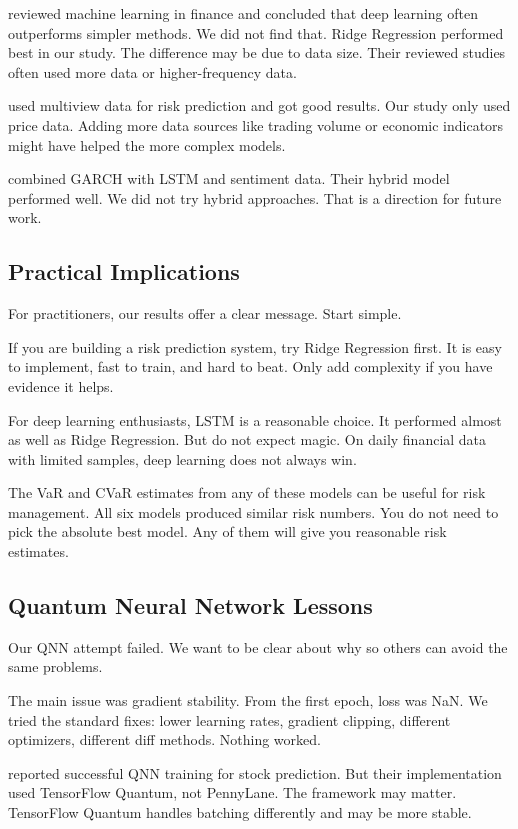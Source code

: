\documentclass[12pt,a4paper]{article}
\begin{document}
\citet{elalami2025b} reviewed machine learning in finance and concluded that deep learning often outperforms simpler methods. We did not find that. Ridge Regression performed best in our study. The difference may be due to data size. Their reviewed studies often used more data or higher-frequency data.

\citet{wang2026} used multiview data for risk prediction and got good results. Our study only used price data. Adding more data sources like trading volume or economic indicators might have helped the more complex models.

\citet{leber2025} combined GARCH with LSTM and sentiment data. Their hybrid model performed well. We did not try hybrid approaches. That is a direction for future work.

\subsection{Practical Implications}
For practitioners, our results offer a clear message. Start simple.

If you are building a risk prediction system, try Ridge Regression first. It is easy to implement, fast to train, and hard to beat. Only add complexity if you have evidence it helps.

For deep learning enthusiasts, LSTM is a reasonable choice. It performed almost as well as Ridge Regression. But do not expect magic. On daily financial data with limited samples, deep learning does not always win.

The VaR and CVaR estimates from any of these models can be useful for risk management. All six models produced similar risk numbers. You do not need to pick the absolute best model. Any of them will give you reasonable risk estimates.

\subsection{Quantum Neural Network Lessons}
Our QNN attempt failed. We want to be clear about why so others can avoid the same problems.

The main issue was gradient stability. From the first epoch, loss was NaN. We tried the standard fixes: lower learning rates, gradient clipping, different optimizers, different diff methods. Nothing worked.

\citet{chen2025} reported successful QNN training for stock prediction. But their implementation used TensorFlow Quantum, not PennyLane. The framework may matter. TensorFlow Quantum handles batching differently and may be more stable.
\end{document}
